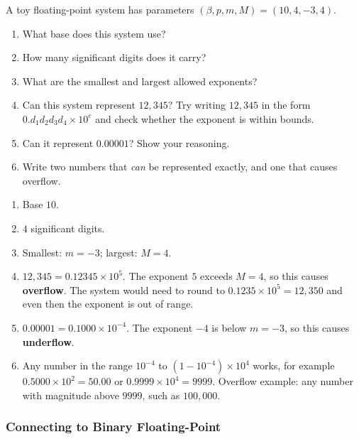 \begin{Exercise}[title={Reading the parameters}, label={ex:fp-parameter}]
  A toy floating-point system has parameters $(\beta, p, m, M) = (10, 4, -3, 4)$.
  \begin{enumerate}
    \item What base does this system use?
    \item How many significant digits does it carry?
    \item What are the smallest and largest allowed exponents?
    \item Can this system represent $12{,}345$?
          Try writing $12{,}345$ in the form $0.d_1d_2d_3d_4 \times 10^e$ and
          check whether the exponent is within bounds.
    \item Can it represent $0.00001$?
          Show your reasoning.
    \item Write two numbers that \emph{can} be represented exactly, and one
          that causes overflow.
  \end{enumerate}
\end{Exercise}
\begin{Answer}[ref={ex:fp-parameter}]
  \begin{enumerate}
    \item Base $10$.
    \item $4$ significant digits.
    \item Smallest: $m = -3$;\; largest: $M = 4$.
    \item $12{,}345 = 0.12345 \times 10^5$.
          The exponent $5$ exceeds $M = 4$, so this causes \textbf{overflow}.
          The system would need to round to $0.1235 \times 10^5 = 12{,}350$
          and even then the exponent is out of range.
    \item $0.00001 = 0.1000 \times 10^{-4}$.
          The exponent $-4$ is below $m = -3$, so this causes
          \textbf{underflow}.
    \item Any number in the range $10^{-4}$ to $(1-10^{-4}) \times 10^4$
          works, for example $0.5000 \times 10^2 = 50.00$ or
          $0.9999 \times 10^{4} = 9999$.
          Overflow example: any number with magnitude above $9999$, such
          as $100{,}000$.
  \end{enumerate}
\end{Answer}

\subsubsection{Connecting to Binary Floating-Point}

